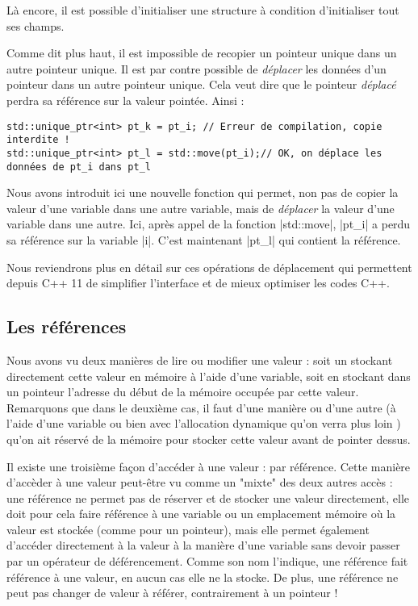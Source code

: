Là encore, il est possible d'initialiser une structure à condition d'initialiser tout ses champs.

Comme dit plus haut, il est impossible de recopier un pointeur unique dans un autre pointeur unique.
Il est par contre possible de \textsl{déplacer} les données d'un pointeur dans un autre pointeur unique. Cela veut dire que le pointeur \textsl{déplacé} perdra sa référence sur la valeur pointée.
Ainsi :
\begin{lstlisting}
std::unique_ptr<int> pt_k = pt_i; // Erreur de compilation, copie interdite !
std::unique_ptr<int> pt_l = std::move(pt_i);// OK, on déplace les données de pt_i dans pt_l
\end{lstlisting}

Nous avons introduit ici une nouvelle fonction qui permet, non pas de copier la valeur d'une variable
dans une autre variable, mais de \textsl{déplacer} la valeur d'une variable dans une autre. Ici, après appel de la fonction |std::move|, |pt_i| a perdu sa référence sur la variable |i|. C'est maintenant |pt_l| qui contient la référence. 

Nous reviendrons plus en détail sur ces opérations de déplacement qui permettent depuis C++ 11
de simplifier l'interface et de mieux optimiser les codes C++.

\subsection{Les références}

Nous avons vu deux manières de lire ou modifier une valeur : soit un stockant directement cette valeur
en mémoire à l'aide d'une variable, soit en stockant dans un pointeur l'adresse du début de la mémoire occupée par cette valeur. Remarquons que dans le deuxième cas, il faut d'une manière ou d'une autre (à l'aide d'une variable ou bien avec l'allocation dynamique qu'on verra plus loin ) qu'on ait réservé
de la mémoire pour stocker cette valeur avant de pointer dessus.

Il existe une troisième façon d'accéder à une valeur : par référence. Cette manière d'accèder à une valeur peut-être vu comme un "mixte" des deux autres accès : une référence ne permet pas de réserver et de stocker une valeur directement, elle doit pour cela faire référence à une variable ou un emplacement mémoire où la valeur est stockée (comme pour un pointeur), mais elle permet également d'accéder directement à la valeur à la manière d'une variable sans devoir passer par un opérateur de déférencement. Comme son nom l'indique, une référence fait référence à une valeur, en aucun cas elle ne la stocke. De plus, une référence ne peut pas changer de valeur à référer, contrairement à un pointeur !

